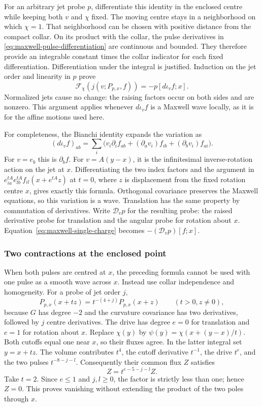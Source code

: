 For an arbitrary jet probe $p$, differentiate this identity in the
enclosed centre while keeping both $v$ and $\chi$ fixed. The moving
centre stays in a neighborhood on which $\chi=1$. That neighborhood
can be chosen with positive distance from the compact collar. On its
product with the collar, the pulse derivatives in
\eqref{eq:maxwell-pulse-differentiation} are continuous and bounded.
They therefore provide an integrable constant times the collar indicator
for each fixed differentiation. Differentiation under the integral is
justified. Induction on the jet order and linearity in $p$ prove
\begin{equation}\label{eq:maxwell-single-charge}
        \mathcal F_\chi(j(v;P_{p,x},f))=-p[d\iota_v f;x].
\end{equation}
Normalized jets cause no change: the raising factors occur on both
sides and are nonzero. This argument applies whenever $d\iota_v f$
is a Maxwell wave locally, as it is for the affine motions used here.

For completeness, the Bianchi identity expands the variation as
\[
 (d\iota_v f)_{ab}
   =\sum_i\bigl(v_i\partial_if_{ab}
              +(\partial_av_i)f_{ib}+(\partial_bv_i)f_{ai}\bigr).
\]
For $v=e_b$ this is $\partial_bf$. For $v=A(y-x)$, it is the
infinitesimal inverse-rotation action on the jet at $x$. Differentiating
the two index factors and the argument in
$e^{tA}_{ia}e^{tA}_{lb}f_{il}(x+e^{tA}z)$ at $t=0$, where $z$
is displacement from the fixed rotation centre $x$, gives exactly
this formula. Orthogonal covariance preserves the Maxwell equations,
so this variation is a wave. Translation has the same property by
commutation of derivatives. Write $\mathscr D_vp$ for the resulting
probe: the raised derivative probe for translation and the angular
probe for rotation about $x$. Equation~\eqref{eq:maxwell-single-charge}
becomes $- (\mathscr D_vp)[f;x]$.

\subsubsection{Two contractions at the enclosed point}
When both pulses are centred at $x$, the preceding formula cannot be
used with one pulse as a smooth wave across $x$. Instead use collar
independence and homogeneity. For a probe of jet order $j$,
\[
 P_{p,x}(x+tz)=t^{-(4+j)}P_{p,x}(x+z)\qquad(t>0,z\ne0),
\]
because $G$ has degree $-2$ and the curvature covariance has two
derivatives, followed by $j$ centre derivatives. The drive has degree
$e=0$ for translation and $e=1$ for rotation about $x$.
Replace $\chi(y)$ by $\psi(y)=\chi(x+(y-x)/t)$. Both cutoffs
equal one near $x$, so their fluxes agree. In the latter integral set
$y=x+tz$. The volume contributes $t^4$, the cutoff derivative
$t^{-1}$, the drive $t^e$, and the two pulses
$t^{-8-j-l}$. Consequently their common flux $Z$ satisfies
\[
                   Z=t^{e-5-j-l}Z.
\]
Take $t=2$. Since $e\le1$ and $j,l\ge0$, the factor is strictly
less than one; hence $Z=0$. This proves vanishing without extending
the product of the two poles through $x$.

